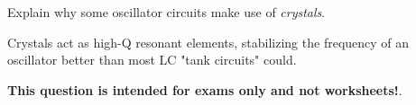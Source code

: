 

Explain why some oscillator circuits make use of {\it crystals}.







Crystals act as high-Q resonant elements, stabilizing the frequency of an oscillator better than most LC "tank circuits" could.







{\bf This question is intended for exams only and not worksheets!}.




